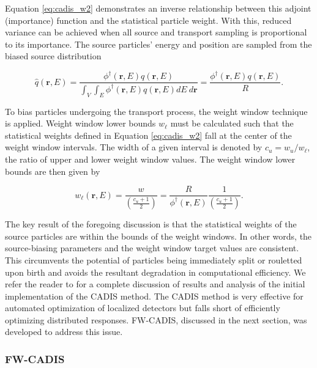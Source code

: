 \documentclass{article} %
\newcommand{\vecr}{\textbf{r}}
\newcommand{\qhat}{\ensuremath{\hat{q}}}
\newcommand{\fwc}{\mbox{FW-CADIS}}
\begin{document}
\noindent Equation \ref{eq:cadis_w2} demonstrates an inverse relationship
between this adjoint (importance) function and the statistical particle weight.
With this, reduced variance can be achieved when all source and transport
sampling is proportional to its importance. The source particles' energy and
position are sampled from the biased source distribution

\begin{equation}
\qhat(\vecr,E) = 
\frac{\phi^{\dagger}(\vecr,E)q(\vecr,E)}
{\int_V\int_E\phi^{\dagger}(\vecr,E)q(\vecr,E) dE\ d\vecr} 
= \frac{\phi^{\dagger}(\vecr,E)q(\vecr,E)}{R}.
\label{eq:cadis_sb}
\end{equation}

To bias particles undergoing the transport process, the weight window technique
is applied. Weight window lower bounds $w_{\ell}$ must be calculated such that
the statistical weights defined in Equation \ref{eq:cadis_w2} fall at the
center of the weight window intervals. The width of a given interval is denoted
by $c_u = w_u/w_{\ell}$, the ratio of upper and lower weight window values. The
weight window lower bounds are then given by

\begin{equation}
w_{\ell}(\vecr,E) = \frac{w}{\left(\frac{c_u +1}{2}\right)} 
= \frac{R}{\phi^{\dagger}(\vecr,E)}\frac{1}{\left(\frac{c_u +1}{2}\right)}.
\label{eq:cadis_tb}
\end{equation}

The key result of the foregoing discussion is that the statistical weights of
the source particles are within the bounds of the weight windows. In other
words, the source-biasing parameters and the weight window target values are
consistent. This circumvents the potential of particles being immediately split
or rouletted upon birth and avoids the resultant degradation in computational
efficiency. We refer the reader to \cite{cadis} for a complete discussion of
results and analysis of the initial implementation of the CADIS method. The
CADIS method is very effective for automated optimization of localized
detectors but falls short of efficiently optimizing distributed responses.
\fwc, discussed in the next section, was developed to address this issue.

\subsubsection{\fwc}
\end{document}
